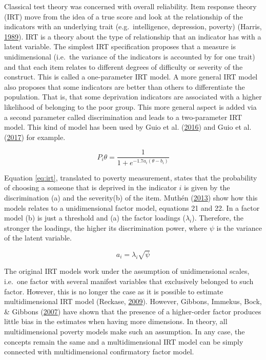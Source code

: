 \documentclass[]{book}
\begin{document}
Classical test theory was concerned with overall reliability. Item response theory (IRT) move from the idea of a true score and look at the relationship of the indicators with an underlying trait (e.g.~intelligence, depression, poverty) (Harris, \protect\hyperlink{ref-Harris1989}{1989}). IRT is a theory about the type of relationship that an indicator has with a latent variable. The simplest IRT specification proposes that a measure is unidimensional (i.e.~the variance of the indicators is accounted by for one trait) and that each item relates to different degrees of difficulty or severity of the construct. This is called a one-parameter IRT model. A more general IRT model also proposes that some indicators are better than others to differentiate the population. That is, that some deprivation indicators are associated with a higher likelihood of belonging to the poor group. This more general aspect is added via a second parameter called discrimination and leads to a two-parameter IRT model. This kind of model has been used by Guio et al. (\protect\hyperlink{ref-Guio2016}{2016}) and Guio et al. (\protect\hyperlink{ref-Guio2017}{2017}) for example.

\begin{equation}
\label{eq:irt}
P_i\theta = \frac{1} {1+e^{-1.7a_i(\theta-b_i)}}
\end{equation}

Equation \eqref{eq:irt}, translated to poverty measurement, states that the probability of choosing a someone that is deprived in the indicator \(i\) is given by the discrimination (a) and the severity(b) of the item. Muthén (\protect\hyperlink{ref-Muthen2013}{2013}) show how this models relates to a unidimensional factor model, equations 21 and 22. In a factor model (b) is just a threshold and (a) the factor loadings (\(\lambda_{i}\)). Therefore, the stronger the loadings, the higher its discrimination power, where \(\psi\) is the variance of the latent variable.

\begin{equation}
\label{eq:irta}
 a_{i}=\lambda_{i}\sqrt{\psi} 
\end{equation}

The original IRT models work under the assumption of unidimensional scales, i.e.~one factor with several manifest variables that exclusively belonged to such factor. However, this is no longer the case as it is possible to estimate multidimensional IRT model (Reckase, \protect\hyperlink{ref-Reckase2009}{2009}). However, Gibbons, Immekus, Bock, \& Gibbons (\protect\hyperlink{ref-Gibbons2007}{2007}) have shown that the presence of a higher-order factor produces little bias in the estimates when having more dimensions. In theory, all multidimensional poverty models make such an assumption. In any case, the concepts remain the same and a multidimensional IRT model can be simply connected with multidimensional confirmatory factor model.
\end{document}
